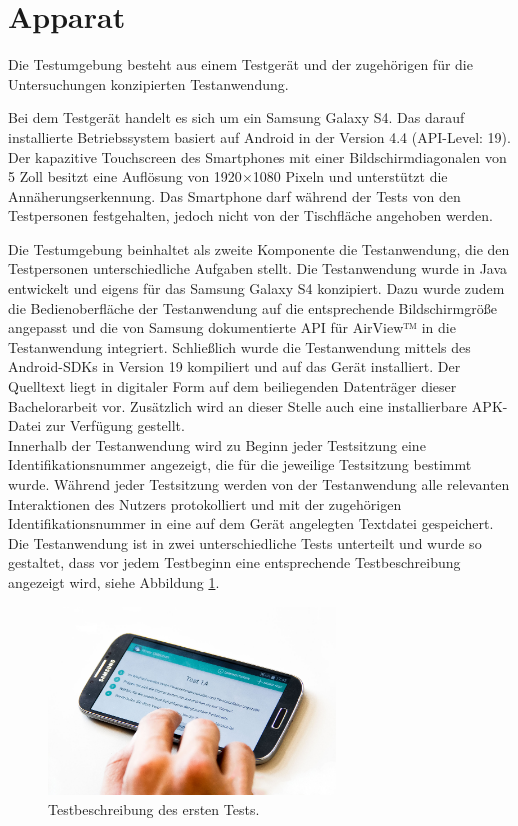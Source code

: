 \documentclass[a4paper,12pt,bibliography=totoc]{scrreprt}%
\begin{document}
\section{Apparat}
Die Testumgebung besteht aus einem Testgerät und der zugehörigen für die Untersuchungen konzipierten Testanwendung.

Bei dem Testgerät handelt es sich um ein Samsung Galaxy S4. Das darauf installierte Betriebssystem basiert auf Android in der Version 4.4 (API-Level: 19). Der kapazitive Touchscreen des Smartphones mit einer Bildschirmdiagonalen von 5 Zoll besitzt eine Auflösung von 1920$\times$1080 Pixeln und unterstützt die Annäherungserkennung. Das Smartphone darf während der Tests von den Testpersonen festgehalten, jedoch nicht von der Tischfläche angehoben werden.

Die Testumgebung beinhaltet als zweite Komponente die Testanwendung, die den Testpersonen unterschiedliche Aufgaben stellt. Die Testanwendung wurde in Java entwickelt und eigens für das Samsung Galaxy S4 konzipiert. Dazu wurde zudem die Bedienoberfläche der Testanwendung auf die entsprechende Bildschirmgröße angepasst und die von Samsung dokumentierte API für AirView™ in die Testanwendung integriert. Schließlich wurde die Testanwendung mittels des Android-SDKs in Version 19 kompiliert und auf das Gerät installiert. Der Quelltext liegt in digitaler Form auf dem beiliegenden Datenträger dieser Bachelorarbeit vor. Zusätzlich wird an dieser Stelle auch eine installierbare APK-Datei zur Verfügung gestellt.\\
Innerhalb der Testanwendung wird zu Beginn jeder Testsitzung eine Identifikationsnummer angezeigt, die für die jeweilige Testsitzung bestimmt wurde. Während jeder Testsitzung werden von der Testanwendung alle relevanten Interaktionen des Nutzers protokolliert und mit der zugehörigen Identifikationsnummer in eine auf dem Gerät angelegten Textdatei gespeichert.\\
Die Testanwendung ist in zwei unterschiedliche Tests unterteilt und wurde so gestaltet, dass vor jedem Testbeginn eine entsprechende Testbeschreibung angezeigt wird, siehe Abbildung \ref{apparattestbeschreibung}.
\begin{figure}
\centering
\includegraphics[width=0.68\textwidth]{img/apparatus1.jpg}
\caption{Testbeschreibung des ersten Tests.}
\label{apparattestbeschreibung}
\end{figure}
\end{document}
